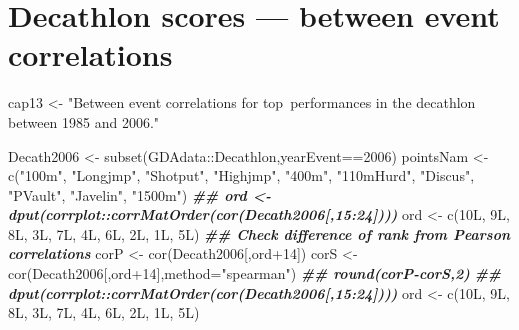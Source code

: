 \documentclass[
  10pt,
  b5paper]{book}
\newenvironment{Shaded}{\begin{snugshade}}{\end{snugshade}}
\newcommand{\AttributeTok}[1]{\textcolor[rgb]{0.77,0.63,0.00}{#1}}
\newcommand{\DecValTok}[1]{\textcolor[rgb]{0.00,0.00,0.81}{#1}}
\newcommand{\DocumentationTok}[1]{\textcolor[rgb]{0.56,0.35,0.01}{\textbf{\textit{#1}}}}
\newcommand{\FunctionTok}[1]{\textcolor[rgb]{0.00,0.00,0.00}{#1}}
\newcommand{\NormalTok}[1]{#1}
\newcommand{\OtherTok}[1]{\textcolor[rgb]{0.56,0.35,0.01}{#1}}
\newcommand{\SpecialCharTok}[1]{\textcolor[rgb]{0.00,0.00,0.00}{#1}}
\newcommand{\StringTok}[1]{\textcolor[rgb]{0.31,0.60,0.02}{#1}}
\begin{document}
\hypertarget{decathlon-scores-between-event-correlations}{%
\section*{Decathlon scores --- between event correlations}\label{decathlon-scores-between-event-correlations}}

\begin{Shaded}
\begin{Highlighting}[]
\NormalTok{cap13 }\OtherTok{\textless{}{-}} \StringTok{"Between event correlations for top performances in the decathlon}
\StringTok{between 1985 and 2006."}
\end{Highlighting}
\end{Shaded}

\begin{Shaded}
\begin{Highlighting}[]
\NormalTok{Decath2006 }\OtherTok{\textless{}{-}} \FunctionTok{subset}\NormalTok{(GDAdata}\SpecialCharTok{::}\NormalTok{Decathlon,yearEvent}\SpecialCharTok{==}\DecValTok{2006}\NormalTok{)}
\NormalTok{pointsNam }\OtherTok{\textless{}{-}} \FunctionTok{c}\NormalTok{(}\StringTok{"100m"}\NormalTok{, }\StringTok{"Longjmp"}\NormalTok{, }\StringTok{"Shotput"}\NormalTok{, }\StringTok{"Highjmp"}\NormalTok{, }\StringTok{"400m"}\NormalTok{, }\StringTok{"110mHurd"}\NormalTok{, }
\StringTok{"Discus"}\NormalTok{, }\StringTok{"PVault"}\NormalTok{, }\StringTok{"Javelin"}\NormalTok{, }\StringTok{"1500m"}\NormalTok{)}
\DocumentationTok{\#\# ord \textless{}{-} dput(corrplot::corrMatOrder(cor(Decath2006[,15:24])))}
\NormalTok{ord }\OtherTok{\textless{}{-}} \FunctionTok{c}\NormalTok{(10L, 9L, 8L, 3L, 7L, 4L, 6L, 2L, 1L, 5L)}
\DocumentationTok{\#\# Check difference of rank from Pearson correlations }
\NormalTok{corP }\OtherTok{\textless{}{-}} \FunctionTok{cor}\NormalTok{(Decath2006[,ord}\SpecialCharTok{+}\DecValTok{14}\NormalTok{])}
\NormalTok{corS }\OtherTok{\textless{}{-}} \FunctionTok{cor}\NormalTok{(Decath2006[,ord}\SpecialCharTok{+}\DecValTok{14}\NormalTok{],}\AttributeTok{method=}\StringTok{"spearman"}\NormalTok{)}
\DocumentationTok{\#\# round(corP{-}corS,2)}
\DocumentationTok{\#\# dput(corrplot::corrMatOrder(cor(Decath2006[,15:24])))}
\NormalTok{ord }\OtherTok{\textless{}{-}} \FunctionTok{c}\NormalTok{(10L, 9L, 8L, 3L, 7L, 4L, 6L, 2L, 1L, 5L)}
\end{Highlighting}
\end{Shaded}
\end{document}
